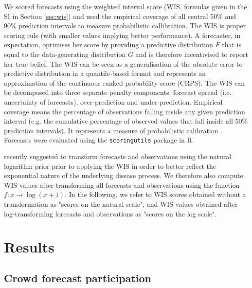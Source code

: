 \documentclass[10pt,a4paper,twocolumn]{article}
\begin{document}
We scored forecasts using the weighted interval score (WIS, formulas given in the SI in Section \ref{sec:wis}) \cite{bracherEvaluatingEpidemicForecasts2021} and used the empirical coverage of all central 50\% and 90\% prediction intervals to measure probabilistic callibration. The WIS is proper scoring rule (with smaller values implying better performance). A forecaster, in expectation, optimises her score by providing a predictive distribution $F$ that is equal to the data-generating distribution $G$ and is therefore incentivised to report her true belief. The WIS can be seen as a generalisation of the absolute error to predictive distribution in a quantile-based format and represents an approximation of the continuous ranked probability score (CRPS). The WIS can be decomposed into three separate penalty components: forecast spread (i.e. uncertainty of forecasts), over-prediction and under-prediction. Empirical coverage means the percentage of observations falling inside any given prediction interval (e.g. the cumulative percentage of observed values that fall inside all 50\% prediction intervals). It represents a measure of probabilistic calibration \citep{gneitingProbabilisticForecastsCalibration2007}. Forecasts were evaluated using the \texttt{scoringutils} \citep{bosseEvaluatingForecastsScoringutils2022} package in \textsf{R}.

\citet{bosseTransformationForecastsEvaluating2023} recently suggested to transform forecasts and observations using the natural logarithm prior prior to applying the WIS in order to better reflect the exponential nature of the underlying disease process. We therefore also compute WIS values after transforming all forecasts and observations using the function $f\colon x \to \log (x + 1)$. In the following, we refer to WIS scores obtained without a transformation as "scores on the natural scale", and WIS values obtained after log-transforming forecasts and observations as "scores on the log scale". 

\section*{Results}

\subsection*{Crowd forecast participation}
\end{document}
